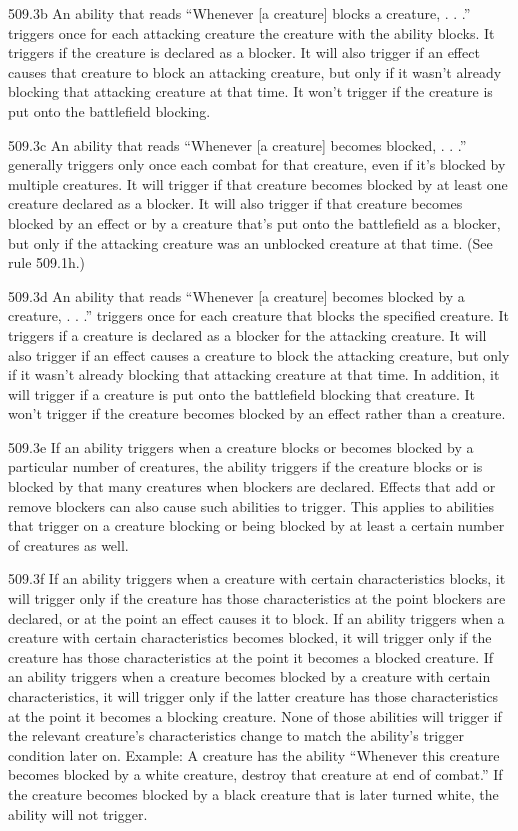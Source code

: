 509.3b An ability that reads “Whenever [a creature] blocks a creature, . . .” triggers once for each attacking creature the creature with the ability blocks. It triggers if the creature is declared as a blocker. It will also trigger if an effect causes that creature to block an attacking creature, but only if it wasn’t already blocking that attacking creature at that time. It won’t trigger if the creature is put onto the battlefield blocking.

509.3c An ability that reads “Whenever [a creature] becomes blocked, . . .” generally triggers only once each combat for that creature, even if it’s blocked by multiple creatures. It will trigger if that creature becomes blocked by at least one creature declared as a blocker. It will also trigger if that creature becomes blocked by an effect or by a creature that’s put onto the battlefield as a blocker, but only if the attacking creature was an unblocked creature at that time. (See rule 509.1h.)

509.3d An ability that reads “Whenever [a creature] becomes blocked by a creature, . . .” triggers once for each creature that blocks the specified creature. It triggers if a creature is declared as a blocker for the attacking creature. It will also trigger if an effect causes a creature to block the attacking creature, but only if it wasn’t already blocking that attacking creature at that time. In addition, it will trigger if a creature is put onto the battlefield blocking that creature. It won’t trigger if the creature becomes blocked by an effect rather than a creature.

509.3e If an ability triggers when a creature blocks or becomes blocked by a particular number of creatures, the ability triggers if the creature blocks or is blocked by that many creatures when blockers are declared. Effects that add or remove blockers can also cause such abilities to trigger. This applies to abilities that trigger on a creature blocking or being blocked by at least a certain number of creatures as well.

509.3f If an ability triggers when a creature with certain characteristics blocks, it will trigger only if the creature has those characteristics at the point blockers are declared, or at the point an effect causes it to block. If an ability triggers when a creature with certain characteristics becomes blocked, it will trigger only if the creature has those characteristics at the point it becomes a blocked creature. If an ability triggers when a creature becomes blocked by a creature with certain characteristics, it will trigger only if the latter creature has those characteristics at the point it becomes a blocking creature. None of those abilities will trigger if the relevant creature’s characteristics change to match the ability’s trigger condition later on.
Example: A creature has the ability “Whenever this creature becomes blocked by a white creature, destroy that creature at end of combat.” If the creature becomes blocked by a black creature that is later turned white, the ability will not trigger.

